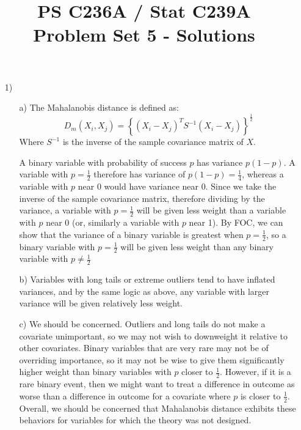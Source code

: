 \documentclass{article}
\begin{document}
\title{PS C236A / Stat C239A \\ Problem Set 5 - Solutions}
\date{}
\maketitle
\begin{itemize}
\item[1)] 
    \begin{itemize}
    \item[a)] 
\vspace{1em} 
The Mahalanobis distance is defined as:
$$D_m(X_i,X_j)=\left\{ (X_i-X_j)^TS^{-1}(X_i- X_j)
\right\}^{\frac{1}{2}}$$
\vspace{1em}
Where $S^{-1}$ is the inverse of the sample covariance matrix of $X$.  

A binary variable with probability of success $p$ has variance $p(1 -
p)$.  A variable with $p = \frac{1}{2}$ therefore has variance of $p(1
- p) = \frac{1}{4}$, whereas a variable with $p$ near 0 would have
variance near 0. Since we take the inverse of the sample covariance
matrix, therefore dividing by the variance, a variable with $p =
\frac{1}{2}$ will be given less weight than a variable with $p$ near
0 (or, similarly a variable with $p$ near 1). By FOC, we can show that
the variance of a binary variable is greatest when $p = \frac{1}{2}$, so a binary
variable with $p = \frac{1}{2}$ will be given less weight than any binary variable
with $p \neq \frac{1}{2}$

   
\item[b)] Variables with long tails or extreme outliers tend to have
  inflated variances, and by the same logic as above, any variable
  with larger variance will be given relatively less weight.
       
\item[c)] We should be concerned. Outliers and long tails do not make
  a covariate unimportant, so we may not wish to downweight it
  relative to other covariates. Binary variables that are very rare
  may not be of overriding importance, so it may not be wise to give
  them significantly higher weight than binary variables with $p$
  closer to $\frac{1}{2}$. However, if it is a rare binary event, then
  we might want to treat a difference in outcome as worse than
  a difference in outcome for a covariate where $p$ is closer to
  $\frac{1}{2}$. Overall, we should be concerned that Mahalanobis
  distance exhibits these behaviors for variables for which the theory
  was not designed.
      

\end{itemize}
\end{itemize}
\end{document}
